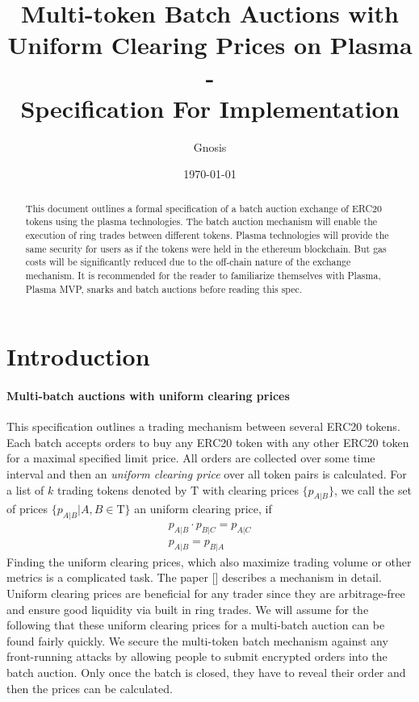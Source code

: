\documentclass[11pt,parskip=full]{scrartcl}%
\title{
  Multi-token Batch Auctions with Uniform Clearing Prices on Plasma\\
  - \\
  \Large Specification For Implementation}
\author{Gnosis}
\date{\today}
\newcommand{\Tau}{\mathrm{T}}
\begin{document}
\maketitle


\begin{abstract}

This document outlines a formal specification of a batch auction exchange of ERC20 tokens using the plasma technologies. The batch auction mechanism will enable the execution of ring trades between different tokens. Plasma technologies will provide the same security for users as if the tokens were held in the ethereum blockchain. But gas costs will be significantly reduced due to the off-chain nature of the exchange mechanism. It is recommended for the reader to familiarize themselves with Plasma\cite{plasma}, Plasma MVP\cite{MVP}, snarks\cite{snarks} and batch auctions\cite{batch} before reading this spec.

\end{abstract}

\tableofcontents

\newpage
\section{Introduction}
\label{sec:introduction}

\paragraph{Multi-batch auctions with uniform clearing prices}

This specification outlines a trading mechanism between several ERC20 tokens. Each batch accepts orders to buy any ERC20 token with any other ERC20 token for a maximal specified limit price. All orders are collected over some time interval and then an \emph{uniform clearing price} over all token pairs is calculated. 
For a list of $k$ trading tokens denoted by $\Tau$ with clearing prices $\{p_{A|B}\}$, we call the set of prices $\{p_{A|B}| A,B \in \Tau \}$ an uniform clearing price, if
\begin{align}
  p_{A|B} \cdot p_{B|C} = p_{A|C}\\
  p_{A|B} = p_{B|A}
\end{align}
Finding the uniform clearing prices, which also maximize trading volume or other metrics is a complicated task. The paper [] describes a mechanism in detail. Uniform clearing prices are beneficial for any trader since they are arbitrage-free and ensure good liquidity via built in ring trades. We will assume for the following that these uniform clearing prices for a multi-batch auction can be found fairly quickly. \newline
We secure the multi-token batch mechanism against any front-running attacks by allowing people to submit encrypted orders into the batch auction. Only once the batch is closed, they have to reveal their order and then the prices can be calculated. 
\end{document}
